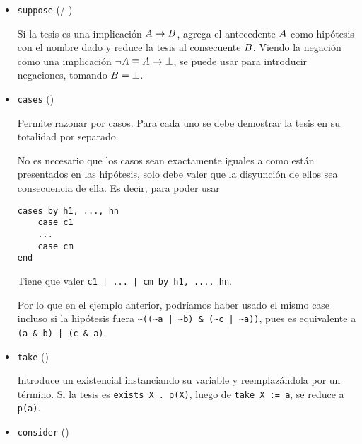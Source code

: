 \begin{itemize}
    \item \lstinline{suppose} ( / )
    
    Si la tesis es una implicación $A \to B$, agrega el antecedente
    $A$ como hipótesis con el nombre dado y reduce la tesis al consecuente
    $B$. Viendo la negación como una implicación $\neg A \equiv
    A \to \bot$, se puede usar para introducir negaciones, tomando
    $B = \bot$.

    \begin{multicols}{2}
        
        \vfill\null
        \columnbreak
            
    \end{multicols}
    \item \lstinline{cases} ()
    
    Permite razonar por casos. Para cada uno se debe demostrar la tesis en su
    totalidad por separado.

    

    No es necesario que los casos sean exactamente iguales a como están
    presentados en las hipótesis, solo debe valer que la disyunción de ellos sea
    consecuencia de ella. Es decir, para poder usar

    \begin{lstlisting}[numbers=none]
cases by h1, ..., hn
    case c1
    ...
    case cm
end
    \end{lstlisting}

    Tiene que valer \lstinline{c1 | ... | cm by h1, ..., hn}.
    
    Por lo que en el ejemplo anterior, podríamos haber usado el mismo case
    incluso si la hipótesis fuera \lstinline{~((~a | ~b) & (~c | ~a))}, pues es
    equivalente a \lstinline{(a & b) | (c & a)}.

    \item \lstinline{take} ()
    
    Introduce un existencial instanciando su variable y reemplazándola por un
    término. Si la tesis es \lstinline{exists X . p(X)}, luego de
    \lstinline{take X := a}, se reduce a \lstinline{p(a)}.

    \item \lstinline{consider} ()
    

\end{itemize}
